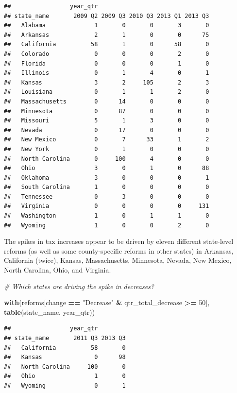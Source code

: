 \documentclass[]{article}
\newenvironment{Shaded}{\begin{snugshade}}{\end{snugshade}}
\newcommand{\KeywordTok}[1]{\textcolor[rgb]{0.13,0.29,0.53}{\textbf{#1}}}
\newcommand{\DecValTok}[1]{\textcolor[rgb]{0.00,0.00,0.81}{#1}}
\newcommand{\StringTok}[1]{\textcolor[rgb]{0.31,0.60,0.02}{#1}}
\newcommand{\CommentTok}[1]{\textcolor[rgb]{0.56,0.35,0.01}{\textit{#1}}}
\newcommand{\OperatorTok}[1]{\textcolor[rgb]{0.81,0.36,0.00}{\textbf{#1}}}
\newcommand{\NormalTok}[1]{#1}
\begin{document}
\begin{verbatim}
##                 year_qtr
## state_name       2009 Q2 2009 Q3 2010 Q3 2013 Q1 2013 Q3
##   Alabama              1       0       0       3       0
##   Arkansas             2       1       0       0      75
##   California          58       1       0      58       0
##   Colorado             0       0       0       2       0
##   Florida              0       0       0       1       0
##   Illinois             0       1       4       0       1
##   Kansas               3       2     105       2       3
##   Louisiana            0       1       1       2       0
##   Massachusetts        0      14       0       0       0
##   Minnesota            0      87       0       0       0
##   Missouri             5       1       3       0       0
##   Nevada               0      17       0       0       0
##   New Mexico           0       7      33       1       2
##   New York             0       1       0       0       0
##   North Carolina       0     100       4       0       0
##   Ohio                 3       0       1       0      88
##   Oklahoma             3       0       0       0       1
##   South Carolina       1       0       0       0       0
##   Tennessee            0       3       0       0       0
##   Virginia             0       0       0       0     131
##   Washington           1       0       1       1       0
##   Wyoming              1       0       0       2       0
\end{verbatim}

The spikes in tax increases appear to be driven by eleven different
state-level reforms (as well as some county-specific reforms in other
states) in Arkansas, California (twice), Kansas, Massachusetts,
Minnesota, Nevada, New Mexico, North Carolina, Ohio, and Virginia.

\begin{Shaded}
\begin{Highlighting}[]
\CommentTok{# Which states are driving the spike in decreases?}

\KeywordTok{with}\NormalTok{(reforms[change }\OperatorTok{==}\StringTok{ "Decrease"} \OperatorTok{&}\StringTok{ }\NormalTok{qtr_total_decrease }\OperatorTok{>=}\StringTok{ }\DecValTok{50}\NormalTok{],}
     \KeywordTok{table}\NormalTok{(state_name, year_qtr))}
\end{Highlighting}
\end{Shaded}

\begin{verbatim}
##                 year_qtr
## state_name       2011 Q3 2013 Q3
##   California          58       0
##   Kansas               0      98
##   North Carolina     100       0
##   Ohio                 1       0
##   Wyoming              0       1
\end{verbatim}
\end{document}

